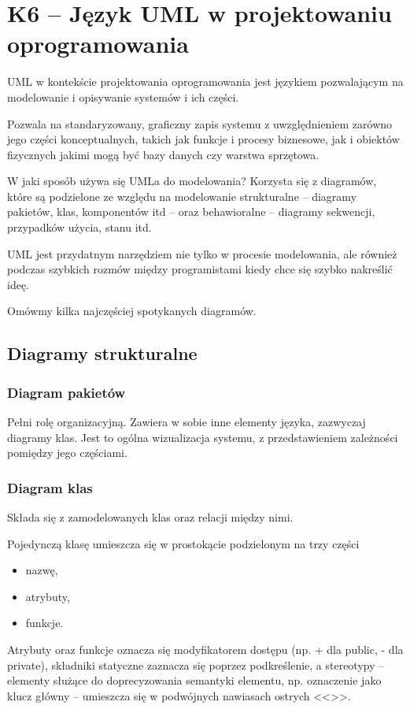 \section{K6 -- Język UML w projektowaniu oprogramowania}

UML w kontekście projektowania oprogramowania jest językiem pozwalającym na modelowanie i opisywanie systemów i ich części.

Pozwala na standaryzowany, graficzny zapis systemu z uwzględnieniem zarówno jego części konceptualnych, takich jak funkcje i procesy biznesowe, jak i obiektów fizycznych jakimi mogą być bazy danych czy warstwa sprzętowa.

W jaki sposób używa się UMLa do modelowania? Korzysta się z diagramów, które są podzielone ze względu na modelowanie strukturalne -- diagramy pakietów, klas, komponentów itd -- oraz behawioralne -- diagramy sekwencji, przypadków użycia, stanu itd.

UML jest przydatnym narzędziem nie tylko w procesie modelowania, ale również podczas szybkich rozmów między programistami kiedy chce się szybko nakreślić ideę.

Omówmy kilka najczęściej spotykanych diagramów.

\subsection{Diagramy strukturalne}
\subsubsection{Diagram pakietów}
Pełni rolę organizacyjną. Zawiera w sobie inne elementy języka, zazwyczaj diagramy klas. Jest to ogólna wizualizacja systemu, z przedstawieniem zależności pomiędzy jego częściami.

\subsubsection{Diagram klas}
Składa się z zamodelowanych klas oraz relacji między nimi.

Pojedynczą klasę umieszcza się w prostokącie podzielonym na trzy części
\begin{itemize}
	\item{nazwę,}
	\item{atrybuty,}
	\item{funkcje.}
\end{itemize}

Atrybuty oraz funkcje oznacza się modyfikatorem dostępu (np. + dla public, - dla private), składniki statyczne zaznacza się poprzez podkreślenie, a stereotypy -- elementy służące do doprecyzowania semantyki elementu, np. oznaczenie jako klucz główny -- umieszcza się w podwójnych nawiasach ostrych <<>>.

